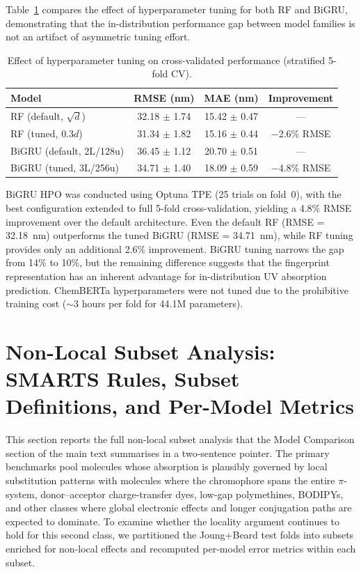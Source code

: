 \documentclass[journal=jcisd8,manuscript=suppinfo]{achemso}
\begin{document}
Table~\ref{tab:tuning_asymmetry} compares the effect of hyperparameter tuning for both RF and BiGRU, demonstrating that the in-distribution performance gap between model families is not an artifact of asymmetric tuning effort.

\begin{table}[htbp]
\centering
\caption{Effect of hyperparameter tuning on cross-validated performance (stratified 5-fold CV).}
\label{tab:tuning_asymmetry}
\begin{tabular}{lccc}
\toprule
\textbf{Model} & \textbf{RMSE (nm)} & \textbf{MAE (nm)} & \textbf{Improvement} \\
\midrule
RF (default, $\sqrt{d}$) & 32.18 $\pm$ 1.74 & 15.42 $\pm$ 0.47 & --- \\
RF (tuned, $0.3d$) & 31.34 $\pm$ 1.82 & 15.16 $\pm$ 0.44 & $-$2.6\% RMSE \\
\midrule
BiGRU (default, 2L/128u) & 36.45 $\pm$ 1.12 & 20.70 $\pm$ 0.51 & --- \\
BiGRU (tuned, 3L/256u) & 34.71 $\pm$ 1.40 & 18.09 $\pm$ 0.59 & $-$4.8\% RMSE \\
\bottomrule
\end{tabular}
\end{table}

BiGRU HPO was conducted using Optuna TPE (25 trials on fold~0), with the best configuration extended to full 5-fold cross-validation, yielding a 4.8\% RMSE improvement over the default architecture.
Even the default RF (RMSE = 32.18~nm) outperforms the tuned BiGRU (RMSE = 34.71~nm), while RF tuning provides only an additional 2.6\% improvement.
BiGRU tuning narrows the gap from 14\% to 10\%, but the remaining difference suggests that the fingerprint representation has an inherent advantage for in-distribution UV absorption prediction.
ChemBERTa hyperparameters were not tuned due to the prohibitive training cost ($\sim$3 hours per fold for 44.1M parameters).


\section{Non-Local Subset Analysis: SMARTS Rules, Subset Definitions, and Per-Model Metrics}
\label{si:nonlocal_smarts}

This section reports the full non-local subset analysis that the Model Comparison section of the main text summarises in a two-sentence pointer. The primary benchmarks pool molecules whose absorption is plausibly governed by local substitution patterns with molecules where the chromophore spans the entire $\pi$-system, donor--acceptor charge-transfer dyes, low-gap polymethines, BODIPYs, and other classes where global electronic effects and longer conjugation paths are expected to dominate. To examine whether the locality argument continues to hold for this second class, we partitioned the Joung+Beard test folds into subsets enriched for non-local effects and recomputed per-model error metrics within each subset.
\end{document}

